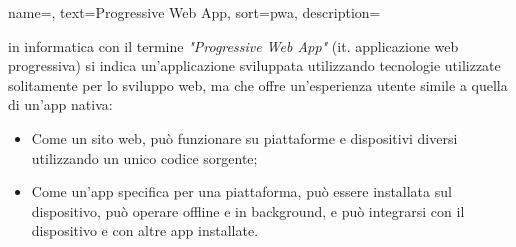 







 {
    name=,
    text=Progressive Web App,
    sort=pwa,
    description={in informatica con il termine \textit{"Progressive Web App"} (it. applicazione web progressiva) si indica un'applicazione sviluppata utilizzando tecnologie utilizzate solitamente per lo sviluppo web, ma che offre un'esperienza utente simile a quella di un'app nativa:
    \begin{itemize}
        \item Come un sito web, può funzionare su piattaforme e dispositivi diversi utilizzando un unico codice sorgente;
        \item Come un'app specifica per una piattaforma, può essere installata sul dispositivo, può operare offline e in background, e può integrarsi con il dispositivo e con altre app installate.
    \end{itemize}
    \cite{site:pwa-mdn}}
}

